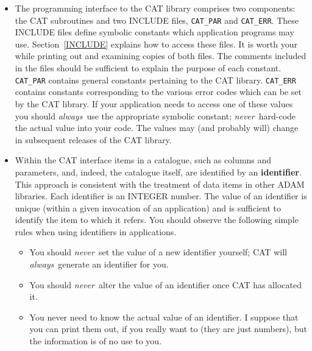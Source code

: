 \begin{itemize}

  \item The programming interface to the CAT library comprises two
   components: the CAT subroutines and two INCLUDE files, {\tt CAT\_PAR}
   and {\tt CAT\_ERR}. These INCLUDE files define symbolic constants 
   which application programs may use. Section~\ref{INCLUDE} explains 
   how to access these files. It is worth your while printing out and 
   examining copies of both files. The comments included in the files 
   should be sufficient to explain the purpose of each constant. {\tt 
   CAT\_PAR} contains general constants pertaining to the CAT library.
   {\tt CAT\_ERR} contains constants corresponding to the various error 
   codes which can be set by the CAT library. If your application needs 
   to access one of these values you should {\it always}\, use the 
   appropriate symbolic constant; {\it never}\, hard-code the actual 
   value into your code. The values may (and probably will) change in 
   subsequent releases of the CAT library.

  \item Within the CAT interface items in a catalogue, such as columns
   and parameters, and, indeed, the catalogue itself, are identified
   by an {\bf identifier}. This approach is consistent with the
   treatment of data items in other ADAM libraries. Each identifier is
   an INTEGER number. The value of an identifier is unique (within a
   given invocation of an application) and is sufficient to identify
   the item to which it refers. You should observe the following simple
   rules when using identifiers in applications.

  \begin{itemize}

    \item You should {\it never}\, set the value of a new identifier 
     yourself; CAT will {\it always}\, generate an identifier for you.

    \item You should {\it never}\, alter the value of an identifier 
     once CAT has allocated it.

    \item You never need to know the actual value of an identifier. I
     suppose that you can print them out, if you really want to (they
     are just numbers), but the information is of no use to you.

  \end{itemize}


\end{itemize}

